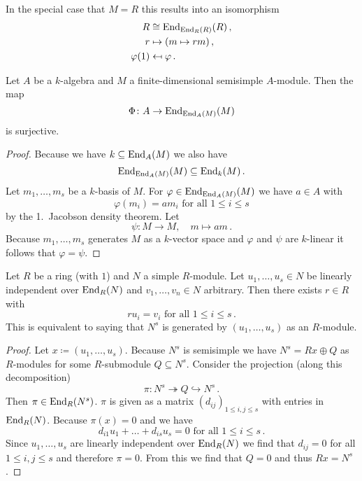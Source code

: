 \begin{rem}
  In the special case that $M = R$ this results into an isomorphism
  \begin{align*}
                R
    &\cong      \operatorname{End}_{\operatorname{End}_R(R)}(R) \,, \\
                r
    &\mapsto    (m \mapsto rm) \,,  \\
                \varphi(1)
    &\mapsfrom  \varphi \,.
  \end{align*}
\end{rem}


\begin{cor}
  Let $A$ be a $k$-algebra and $M$ a finite-dimensional semisimple $A$-module.
  Then the map
  \[
            \Phi
    \colon  A
    \to     \operatorname{End}_{\operatorname{End}_A(M)}(M)
  \]
  is surjective.
\end{cor}
\begin{proof}
  Because we have $k \subseteq \operatorname{End}_A(M)$ we also have
  \[
              \operatorname{End}_{\operatorname{End}_A(M)}(M)
    \subseteq \operatorname{End}_k(M) \,.
  \]
  Let $m_1, \dotsc, m_s$ be a $k$-basis of $M$.
  For $\varphi \in \operatorname{End}_{\operatorname{End}_A(M)}(M)$ we have $a \in A$ with
  \[
      \varphi(m_i)
    = a m_i
    \text{ for all }
    1 \leq i \leq s
  \]
  by the 1.\ Jacobson density theorem.
  Let
  \[
            \psi
    \colon  M \to M,
    \quad   m
    \mapsto am \,.
  \]
  Because $m_1, \dotsc, m_s$ generates $M$ as a $k$-vector space and $\varphi$ and $\psi$ are $k$-linear it follows that $\varphi = \psi$.
\end{proof}


\begin{thrm}
  Let $R$ be a ring (with $1$) and $N$ a simple $R$-module.
  Let $u_1, \dotsc, u_s \in N$ be linearly independent over $\operatorname{End}_R(N)$ and $v_1, \dotsc, v_n \in N$ arbitrary.
  Then there exists $r \in R$ with
  \[
      r u_i
    = v_i
    \text{ for all }
    1 \leq i \leq s \,.
  \]
  This is equivalent to saying that $N^s$ is generated by $(u_1, \dotsc, u_s)$ as an $R$-module.
\end{thrm}


\begin{proof}
  Let $x \coloneqq (u_1, \dotsc, u_s)$.
  Because $N^s$ is semisimple we have $N^s = Rx \oplus Q$ as $R$-modules for some $R$-submodule $Q \subseteq N^s$.
  Consider the projection (along this decomposition)
  \[
                        \pi
    \colon              N^s
    \twoheadrightarrow  Q
    \hookrightarrow     N^s \,.
  \]
  Then $\pi \in \operatorname{End}_R(N^s)$.
  $\pi$ is given as a matrix $(d_{ij})_{1 \leq i,j \leq s}$ with entries in $\operatorname{End}_R(N)$.
  Because $\pi(x) = 0$ and we have
  \[
      d_{i1} u_1 + \dotsc + d_{is} u_s
    = 0
    \text{ for all }
    1 \leq i \leq s \,.
  \]
  Since $u_1, \dotsc, u_s$ are linearly independent over $\operatorname{End}_R(N)$ we find that $d_{ij} = 0$ for all $1 \leq i,j \leq s$ and therefore $\pi = 0$.
  From this we find that $Q = 0$ and thus $Rx = N^s$.
\end{proof}


